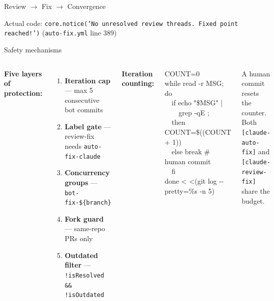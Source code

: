 \documentclass[aspectratio=169,10pt]{beamer}
\begin{document}
\begin{frame}{Review $\to$ Fix $\to$ Convergence}
\begin{center}
    \end{center}
    \vspace{0.2em}
    \textcolor{dimwhite}{\footnotesize Actual code: \texttt{core.notice('No unresolved review threads. Fixed point reached!')} (\texttt{auto-fix.yml} line 389)}
\end{frame}

\begin{frame}{Safety mechanisms}
    \vspace{-0.6em}
    \begin{columns}[T]
        {\small\textcolor{amber}{\textbf{Five layers of protection:}}}
        \begin{enumerate}\setlength{\itemsep}{1pt}
            \item \textbf{Iteration cap} --- max 5 consecutive bot commits
            \item \textbf{Label gate} --- review-fix needs \texttt{auto-fix-claude}
            \item \textbf{Concurrency groups} --- \texttt{bot-fix-\$\{branch\}}
            \item \textbf{Fork guard} --- same-repo PRs only
            \item \textbf{Outdated filter} --- \texttt{!isResolved \&\& !isOutdated}
        \end{enumerate}

        {\small\textcolor{amber}{\textbf{Iteration counting:}}}
        \vspace{0.2em}

        {\ttfamily\scriptsize\color{dimwhite}
        COUNT=0\\
        while read -r MSG; do\\
        ~~if echo "\$MSG" |\\
        ~~~~grep -qE \textquotesingle;\\
        ~~then COUNT=\$((COUNT + 1))\\
        ~~else break \# human commit\\
        ~~fi\\
        done < <(git log -{}-pretty=\%s -n 5)
        }
        \vspace{0.2em}

        {\scriptsize \textcolor{leangreen}{A human commit resets the counter.} Both \texttt{[claude-auto-fix]} and \texttt{[claude-review-fix]} share the budget.}
    \end{columns}
\end{frame}
\end{document}
